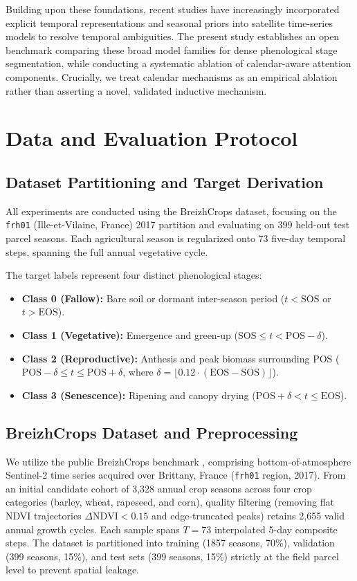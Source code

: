 \documentclass[runningheads]{llncs}
\begin{document}
Building upon these foundations, recent studies have increasingly incorporated explicit temporal representations and seasonal priors into satellite time-series models \cite{russwurm2018,yuan2022} to resolve temporal ambiguities. The present study establishes an open benchmark comparing these broad model families for dense phenological stage segmentation, while conducting a systematic ablation of calendar-aware attention components. Crucially, we treat calendar mechanisms as an empirical ablation rather than asserting a novel, validated inductive mechanism.

\section{Data and Evaluation Protocol}
\subsection{Dataset Partitioning and Target Derivation}
All experiments are conducted using the BreizhCrops dataset, focusing on the \texttt{frh01} (Ille-et-Vilaine, France) 2017 partition and evaluating on 399 held-out test parcel seasons. Each agricultural season is regularized onto 73 five-day temporal steps, spanning the full annual vegetative cycle.

The target labels represent four distinct phenological stages:
\begin{itemize}
    \item \textbf{Class 0 (Fallow):} Bare soil or dormant inter-season period ($t < \text{SOS}$ or $t > \text{EOS}$).
    \item \textbf{Class 1 (Vegetative):} Emergence and green-up ($\text{SOS} \le t < \text{POS} - \delta$).
    \item \textbf{Class 2 (Reproductive):} Anthesis and peak biomass surrounding POS ($\text{POS} - \delta \le t \le \text{POS} + \delta$, where $\delta = \lfloor 0.12 \cdot (\text{EOS} - \text{SOS}) \rfloor$).
    \item \textbf{Class 3 (Senescence):} Ripening and canopy drying ($\text{POS} + \delta < t \le \text{EOS}$).
\end{itemize}

\subsection{BreizhCrops Dataset and Preprocessing}
We utilize the public BreizhCrops benchmark \cite{breizhcrops}, comprising bottom-of-\allowbreak atmosphere Sentinel-2 time series acquired over Brittany, France (\texttt{frh01} region, 2017). From an initial candidate cohort of 3,328 annual crop seasons across four crop categories (barley, wheat, rapeseed, and corn), quality filtering (removing flat NDVI trajectories $\Delta\text{NDVI} < 0.15$ and edge-truncated peaks) retains 2,655 valid annual growth cycles. Each sample spans $T=73$ interpolated 5-day composite steps. The dataset is partitioned into training (1857 seasons, 70\%), validation (399 seasons, 15\%), and test sets (399 seasons, 15\%) strictly at the field parcel level to prevent spatial leakage.
\end{document}
